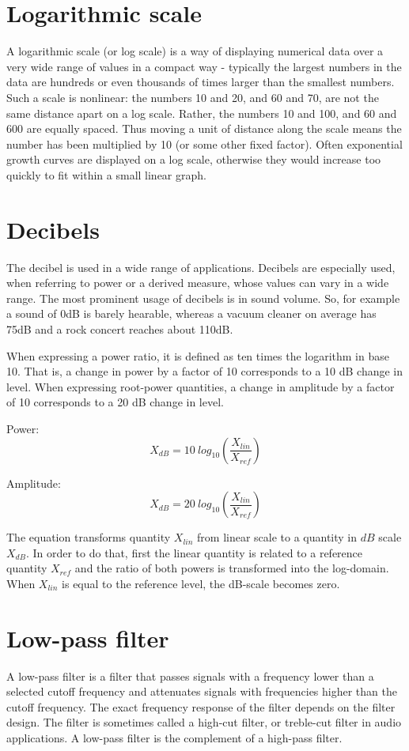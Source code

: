 \documentclass[journal,compsoc]{IEEEtran}
\begin{document}
\section{Logarithmic scale}
A logarithmic scale (or log scale) is a way of displaying numerical data over a very wide range of values in a compact way - typically the largest numbers in the data are hundreds or even thousands of times larger than the smallest numbers. Such a scale is nonlinear: the numbers 10 and 20, and 60 and 70, are not the same distance apart on a log scale. Rather, the numbers 10 and 100, and 60 and 600 are equally spaced. Thus moving a unit of distance along the scale means the number has been multiplied by 10 (or some other fixed factor). Often exponential growth curves are displayed on a log scale, otherwise they would increase too quickly to fit within a small linear graph.

\section{Decibels}
The decibel is used in a wide range of applications. Decibels are especially used, when referring to power or a derived measure, whose values can vary in a wide range. The most prominent usage of decibels is in sound volume. So, for example a sound of 0dB is barely hearable, whereas a vacuum cleaner on average has 75dB and a rock concert reaches about 110dB.

When expressing a power ratio, it is defined as ten times the logarithm in base 10. That is, a change in power by a factor of 10 corresponds to a 10 dB change in level. When expressing root-power quantities, a change in amplitude by a factor of 10 corresponds to a 20 dB change in level.

Power:
\[ X_{dB} = 10\ log_{10}\left(\frac{X_{lin}}{X_{ref}}\right)\]

Amplitude:
\[ X_{dB} = 20\ log_{10}\left(\frac{X_{lin}}{X_{ref}}\right)\]

The equation transforms quantity \(X_{lin}\) from linear scale to a quantity in \(dB\) scale \(X_{dB}\). In order to do that, first the linear quantity is related to a reference quantity \(X_{ref}\) and the ratio of both powers is transformed into the log-domain. When \(X_{lin}\) is equal to the reference level, the dB-scale becomes zero.

\section{Low-pass filter}
A low-pass filter is a filter that passes signals with a frequency lower than a selected cutoff frequency and attenuates signals with frequencies higher than the cutoff frequency. The exact frequency response of the filter depends on the filter design. The filter is sometimes called a high-cut filter, or treble-cut filter in audio applications. A low-pass filter is the complement of a high-pass filter.
\end{document}
